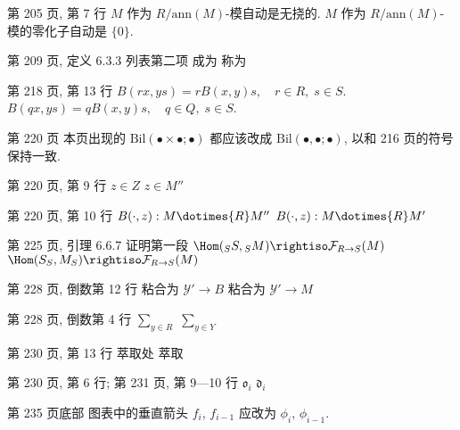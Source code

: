 \documentclass{AJerrata}
\begin{document}
\begin{Errata}
   		\item[第 205 页, 第 7 行]
		\Orig $M$ 作为 $R/\mathrm{ann}(M)$-模自动是无挠的.
		\Corr $M$ 作为 $R/\mathrm{ann}(M)$-模的零化子自动是 $\{0\}$.
		
		\item[第 209 页, 定义 6.3.3 列表第二项]
		\Orig 成为
		\Corr 称为

        \item[第 218 页, 第 13 行]
        \Orig $B(rx, ys) = rB(x,y)s, \quad r \in R, \; s \in S$.
        \newline
        \Corr $B(qx, ys) = qB(x,y)s, \quad q \in Q, \; s \in S$.

        \item[第 220 页]
        本页出现的 $\mathrm{Bil}(\bullet \times \bullet; \bullet)$ 都应该改成 $\mathrm{Bil}(\bullet, \bullet; \bullet)$, 以和 216 页的符号保持一致.
        
        \item[第 220 页, 第 9 行]
        \Orig $z \in Z$
        \Corr $z \in M''$
        
        \item[第 220 页, 第 10 行]
        \Orig $B(\cdot, z): M \dotimes{R} M''$
        \Corr $B(\cdot, z): M \dotimes{R} M'$
        
        \item[第 225 页, 引理 6.6.7 证明第一段]
        \Orig $\Hom({}_S S, {}_S M) \rightiso \mathcal{F}_{R \to S}(M)$
        \Corr $\Hom(S_S, M_S) \rightiso \mathcal{F}_{R \to S}(M)$
        
        \item[第 228 页, 倒数第 12 行]
        \Orig 粘合为 $\mathcal{Y}' \to B$
        \Corr 粘合为 $\mathcal{Y}' \to M$
       
        \item[第 228 页, 倒数第 4 行]
        \Orig $\sum_{y \in R}$
        \Corr $\sum_{y \in Y}$
        
        \item[第 230 页, 第 13 行]
        \Orig 萃取处
        \Corr 萃取
        
		\item[第 230 页, 第 6 行; 第 231 页, 第 9---10 行]
		\Orig $\mathfrak{o}_i$
		\Corr $\mathfrak{d}_i$
        
        \item[第 235 页底部]
        图表中的垂直箭头 $f_i$, $f_{i-1}$ 应改为 $\phi_i$, $\phi_{i-1}$.
        

\end{Errata}
\end{document}
